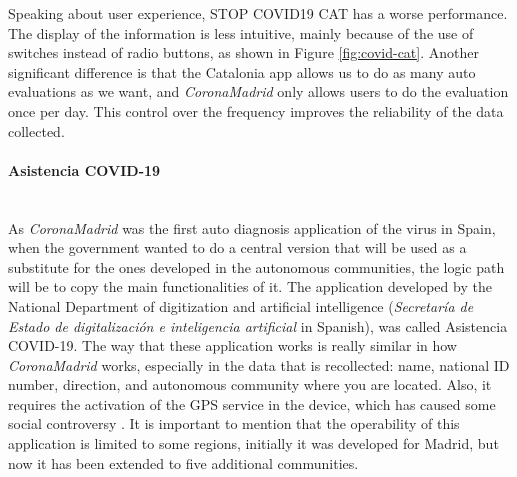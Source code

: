 \documentclass[a4paper, 12pt]{article}
\begin{document}
Speaking about user experience, STOP COVID19 CAT has a worse performance. The display of the information is less intuitive, mainly because of the use of switches instead of radio buttons, as shown in Figure \ref{fig:covid-cat}. Another significant difference is that the Catalonia app allows us to do as many auto evaluations as we want, and \textit{CoronaMadrid} only allows users to do the evaluation once per day. This control over the frequency improves the reliability of the data collected. 

\paragraph{Asistencia COVID-19} \mbox{} \\

As \textit{CoronaMadrid} was the first auto diagnosis application of the virus in Spain, when the government wanted to do a central version that will be used as a substitute for the ones developed in the autonomous communities, the logic path will be to copy the main functionalities of it. The application developed by the National Department of digitization and artificial intelligence (\textit{Secretaría de Estado de digitalización e inteligencia artificial} in Spanish), was called Asistencia COVID-19. The way that these application works is really similar in how \textit{CoronaMadrid} works, especially in the data that is recollected: name, national ID number, direction, and autonomous community where you are located. Also, it requires the activation of the GPS service in the device, which has caused some social controversy \cite{geolocalization-asistencia-covid-19}. It is important to mention that the operability of this application is limited to some regions, initially it was developed for Madrid, but now it has been extended to five additional communities.\\
\end{document}
